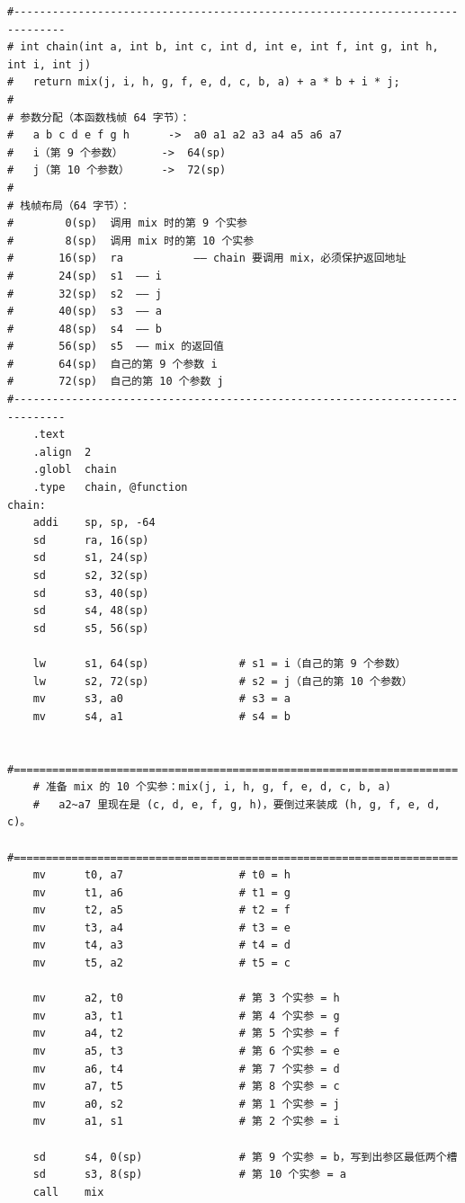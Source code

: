 \documentclass[UTF8,a4paper,10pt]{ctexart}
\begin{document}
\begin{lstlisting}[language=riscv]
#------------------------------------------------------------------------------
# int chain(int a, int b, int c, int d, int e, int f, int g, int h, int i, int j)
#   return mix(j, i, h, g, f, e, d, c, b, a) + a * b + i * j;
#
# 参数分配（本函数栈帧 64 字节）：
#   a b c d e f g h      ->  a0 a1 a2 a3 a4 a5 a6 a7
#   i（第 9 个参数）      ->  64(sp)
#   j（第 10 个参数）     ->  72(sp)
#
# 栈帧布局（64 字节）：
#        0(sp)  调用 mix 时的第 9 个实参
#        8(sp)  调用 mix 时的第 10 个实参
#       16(sp)  ra           —— chain 要调用 mix，必须保护返回地址
#       24(sp)  s1  —— i
#       32(sp)  s2  —— j
#       40(sp)  s3  —— a
#       48(sp)  s4  —— b
#       56(sp)  s5  —— mix 的返回值
#       64(sp)  自己的第 9 个参数 i
#       72(sp)  自己的第 10 个参数 j
#------------------------------------------------------------------------------
    .text
    .align  2
    .globl  chain
    .type   chain, @function
chain:
    addi    sp, sp, -64
    sd      ra, 16(sp)
    sd      s1, 24(sp)
    sd      s2, 32(sp)
    sd      s3, 40(sp)
    sd      s4, 48(sp)
    sd      s5, 56(sp)

    lw      s1, 64(sp)              # s1 = i（自己的第 9 个参数）
    lw      s2, 72(sp)              # s2 = j（自己的第 10 个参数）
    mv      s3, a0                  # s3 = a
    mv      s4, a1                  # s4 = b

    #=====================================================================
    # 准备 mix 的 10 个实参：mix(j, i, h, g, f, e, d, c, b, a)
    #   a2~a7 里现在是 (c, d, e, f, g, h)，要倒过来装成 (h, g, f, e, d, c)。
    #=====================================================================
    mv      t0, a7                  # t0 = h
    mv      t1, a6                  # t1 = g
    mv      t2, a5                  # t2 = f
    mv      t3, a4                  # t3 = e
    mv      t4, a3                  # t4 = d
    mv      t5, a2                  # t5 = c

    mv      a2, t0                  # 第 3 个实参 = h
    mv      a3, t1                  # 第 4 个实参 = g
    mv      a4, t2                  # 第 5 个实参 = f
    mv      a5, t3                  # 第 6 个实参 = e
    mv      a6, t4                  # 第 7 个实参 = d
    mv      a7, t5                  # 第 8 个实参 = c
    mv      a0, s2                  # 第 1 个实参 = j
    mv      a1, s1                  # 第 2 个实参 = i

    sd      s4, 0(sp)               # 第 9 个实参 = b，写到出参区最低两个槽
    sd      s3, 8(sp)               # 第 10 个实参 = a
    call    mix


\end{lstlisting}
\end{document}
